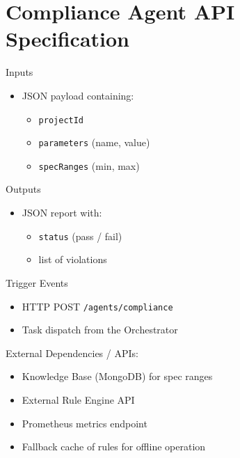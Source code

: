 \documentclass[12pt]{report}
\begin{document}
\section{Compliance Agent API Specification}
\begin{description}
  \item Inputs 
    \begin{itemize}
      \item JSON payload containing:
      \begin{itemize}
        \item \texttt{projectId}
        \item \texttt{parameters} (name, value)
        \item \texttt{specRanges} (min, max)
      \end{itemize}
    \end{itemize}
  \item Outputs 
    \begin{itemize}
      \item JSON report with:
      \begin{itemize}
        \item \texttt{status} (pass / fail)
        \item list of violations
      \end{itemize}
    \end{itemize}
  \item Trigger Events
    \begin{itemize}
      \item HTTP POST \texttt{/agents/compliance}
      \item Task dispatch from the Orchestrator
    \end{itemize}
  \item External Dependencies / APIs:
    \begin{itemize}
      \item Knowledge Base (MongoDB) for spec ranges  
      \item External Rule Engine API  
      \item Prometheus metrics endpoint  
      \item Fallback cache of rules for offline operation  
    \end{itemize}
\end{description}
\end{document}
